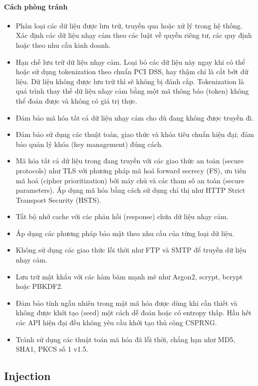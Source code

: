 \paragraph{Cách phòng tránh}

\begin{itemize}
    \item Phân loại các dữ liệu được lưu trữ, truyền qua hoặc xử lý trong hệ thống. Xác định các dữ liệu nhạy cảm theo các luật về quyền riêng tư, các quy định hoặc theo nhu cầu kinh doanh.
    \item Hạn chế lưu trữ dữ liệu nhạy cảm. Loại bỏ các dữ liệu này ngay khi có thể hoặc sử dụng tokenization theo chuẩn PCI DSS, hay thậm chí là cắt bớt dữ liệu. Dữ liệu không được lưu trữ thì sẽ không bị đánh cắp.
    Tokenization là quá trình thay thế dữ liệu nhạy cảm bằng một mã thông báo (token) không thể đoán được và không có giá trị thực.
    \item Đảm bảo mã hóa tất cả dữ liệu nhạy cảm cho dù đang không được truyền đi.
    \item Đảm bảo sử dụng các thuật toán, giao thức và khóa tiêu chuẩn hiện đại; đảm bảo quản lý khóa (key management) đúng cách.
    \item Mã hóa tất cả dữ liệu trong đang truyền với các giao thức an toàn (secure protocols) như TLS với phương pháp mã hoá forward secrecy (FS), ưu tiên mã hoá (cipher prioritization) bởi máy chủ và các tham số an toàn (secure parameters). Áp dụng mã hóa bằng cách sử dụng chỉ thị như HTTP Strict Transport Security (HSTS).
    \item Tắt bộ nhớ cache với các phản hồi (response) chứa dữ liệu nhạy cảm.
    \item Áp dụng các phương pháp bảo mật theo nhu cầu của từng loại dữ liệu.
    \item Không sử dụng các giao thức lỗi thời như FTP và SMTP để truyền dữ liệu nhạy cảm.
    \item Lưu trữ mật khẩu với các hàm băm mạnh mẽ như Argon2, scrypt, bcrypt hoặc PBKDF2.
    \item Đảm bảo tính ngẫu nhiên trong mật mã hóa được dùng khi cần thiết và không được khởi tạo (seed) một cách dễ đoán hoặc có entropy thấp. Hầu hết các API hiện đại đều không yêu cầu khởi tạo thủ công CSPRNG.
    \item Tránh sử dụng các thuật toán mã hóa đã lỗi thời, chẳng hạn như MD5, SHA1, PKCS số 1 v1.5.
\end{itemize}

\subsection{Injection ~\cite{chap2bib12}}

